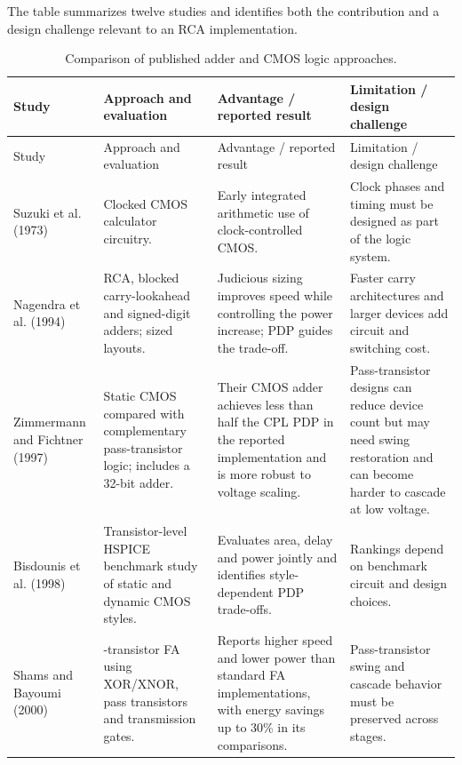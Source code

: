 \documentclass[11pt,a4paper]{article}
\begin{document}
The table summarizes twelve studies and identifies both the contribution and a design challenge relevant to an RCA implementation.
\small\setlength{\tabcolsep}{3pt}\renewcommand{\arraystretch}{1.14}
\begin{longtable}{>{\raggedright\arraybackslash}p{}>{\raggedright\arraybackslash}p{}>{\raggedright\arraybackslash}p{}>{\raggedright\arraybackslash}p{}}
\caption{Comparison of published adder and CMOS logic approaches.}\label{tab:literature}\\
\toprule Study & Approach and evaluation & Advantage / reported result & Limitation / design challenge\\
\midrule\endfirsthead
\toprule Study & Approach and evaluation & Advantage / reported result & Limitation / design challenge\\
\midrule\endhead
Suzuki et al. (1973) \cite{Suzuki1973} & Clocked CMOS calculator circuitry. & Early integrated arithmetic use of clock-controlled CMOS. & Clock phases and timing must be designed as part of the logic system.\\
Nagendra et al. (1994) \cite{Nagendra1994} & RCA, blocked carry-lookahead and signed-digit adders; sized layouts. & Judicious sizing improves speed while controlling the power increase; PDP guides the trade-off. & Faster carry architectures and larger devices add circuit and switching cost.\\
Zimmermann and Fichtner (1997) \cite{Zimmermann1997} & Static CMOS compared with complementary pass-transistor logic; includes a 32-bit adder. & Their CMOS adder achieves less than half the CPL PDP in the reported implementation and is more robust to voltage scaling. & Pass-transistor designs can reduce device count but may need swing restoration and can become harder to cascade at low voltage.\\
Bisdounis et al. (1998) \cite{Bisdounis1998} & Transistor-level HSPICE benchmark study of static and dynamic CMOS styles. & Evaluates area, delay and power jointly and identifies style-dependent PDP trade-offs. & Rankings depend on benchmark circuit and design choices.\\
Shams and Bayoumi (2000) \cite{Shams2000} & 16-transistor FA using XOR/XNOR, pass transistors and transmission gates. & Reports higher speed and lower power than standard FA implementations, with energy savings up to 30\% in its comparisons. & Pass-transistor swing and cascade behavior must be preserved across stages.\\

\end{longtable}
\end{document}
